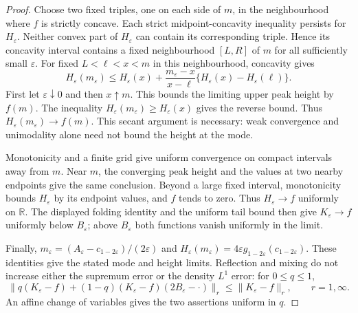 \begin{proof}
Choose two fixed triples, one on each side of $m$, in the neighbourhood
where $f$ is strictly concave. Each strict midpoint-concavity inequality
persists for $H_\varepsilon$. Neither convex part of
$H_\varepsilon$ can contain its corresponding triple. Hence its
concavity interval contains a fixed neighbourhood $[L,R]$ of $m$ for
all sufficiently small $\varepsilon$.
For fixed $L<\ell<x<m$ in this neighbourhood, concavity gives
\[
 H_\varepsilon(m_\varepsilon)
 \le H_\varepsilon(x)
    +\frac{m_\varepsilon-x}{x-\ell}
       \{H_\varepsilon(x)-H_\varepsilon(\ell)\}.
\]
First let $\varepsilon\downarrow0$ and then $x\uparrow m$. This bounds
the limiting upper peak height by $f(m)$. The inequality
$H_\varepsilon(m_\varepsilon)\ge H_\varepsilon(x)$ gives the reverse
bound. Thus $H_\varepsilon(m_\varepsilon)\to f(m)$.
This secant argument is necessary: weak convergence and unimodality
alone need not bound the height at the mode.

Monotonicity and a finite grid give uniform convergence on compact
intervals away from $m$. Near $m$, the converging peak height and the
values at two nearby endpoints give the same conclusion. Beyond a
large fixed interval, monotonicity bounds $H_\varepsilon$ by its endpoint
values, and $f$ tends to zero. Thus $H_\varepsilon\to f$ uniformly on
$\mathbb R$. The displayed folding identity and the uniform tail bound
then give $K_\varepsilon\to f$ uniformly below $B_\varepsilon$; above
$B_\varepsilon$ both functions vanish uniformly in the limit.

Finally,
$m_\varepsilon=(A_\varepsilon-c_{1-2\varepsilon})/(2\varepsilon)$ and
$H_\varepsilon(m_\varepsilon)
 =4\varepsilon g_{1-2\varepsilon}(c_{1-2\varepsilon})$.
These identities give the stated mode and height limits.
Reflection and mixing do not increase either the supremum error or
the density $L^1$ error: for $0\le q\le1$,
\[
 \big\|q(K_\varepsilon-f)
 +(1-q)(K_\varepsilon-f)(2B_\varepsilon-\cdot)\big\|_r
 \le\|K_\varepsilon-f\|_r,\qquad r=1,\infty.
\]
An affine change of variables gives the two assertions uniform in $q$.
\end{proof}

